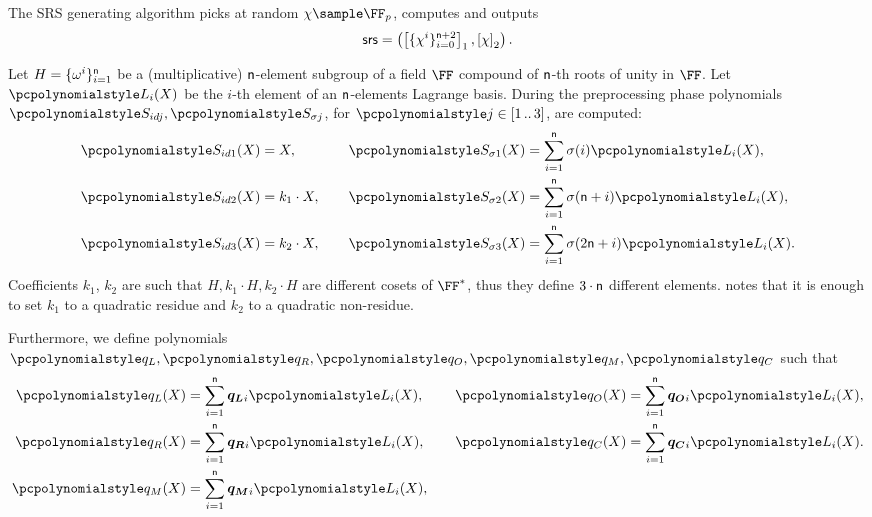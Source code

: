 The SRS generating algorithm picks at random $\chi \sample \FF_p$, computes
and outputs
\[
	\mathsf{srs} = \left(\left[\{\chi^i\}_{i = 0}^{\mathsf{n} + 2}\right]_{1},
	\left[\chi\right]_{2} \right).
\]

Let $H = \{\omega^i\}_{i = 1}^{\mathsf{n} }$ be a
(multiplicative) $\mathsf{n}$-element subgroup of a field $\FF$
compound of $\mathsf{n}$-th roots of unity in $\FF$. Let $\lag_i(X)$ be
the $i$-th element of an $\mathsf{n}$-elements Lagrange basis. During
the preprocessing phase polynomials $\p{S_{id j}}, \p{S_{\sigma j}}$, for
$\p{j} \in \range{1}{3}$, are computed:
\begin{equation*}
  \begin{aligned}
    \p{S_{id 1}}(X) & = X,\vphantom{\sum_{i = 1}^{\noofc} \sigma(i) \lag_i(X),}\\
    \p{S_{id 2}}(X) & = k_1 \cdot X,\vphantom{\sum_{i = 1}^{\noofc} \sigma(i) \lag_i(X),}\\
    \p{S_{id 3}}(X) & = k_2 \cdot X,\vphantom{\sum_{i = 1}^{\noofc} \sigma(i) \lag_i(X),}
  \end{aligned}
  \qquad
\begin{aligned}
  \p{S_{\sigma 1}}(X) & = \sum_{i = 1}^{\noofc} \sigma(i) \lag_i(X),\\
  \p{S_{\sigma 2}}(X) & = \sum_{i = 1}^{\noofc}
  \sigma(\noofc + i) \lag_i(X),\\
  \p{S_{\sigma 3}}(X) & =\sum_{i = 1}^{\noofc} \sigma(2 \noofc + i) \lag_i(X).
\end{aligned}
\end{equation*}
Coefficients $k_1$, $k_2$ are such that $H, k_1 \cdot H, k_2 \cdot H$ are
different cosets of $\FF^*$, thus they define $3 \cdot \mathsf{n}$
different elements. \cite{EPRINT:GabWilCio19} notes that it is enough to set
$k_1$ to a quadratic residue and $k_2$ to a quadratic non-residue.

Furthermore, we define polynomials $\p{q_L}, \p{q_R}, \p{q_O}, \p{q_M}, \p{q_C}$
such that
\begin{equation*}
  \begin{aligned}
  \p{q_L}(X) & = \sum_{i = 1}^{\noofc} \vql_i \lag_i(X), \\
  \p{q_R}(X) & = \sum_{i = 1}^{\noofc} \vqr_i \lag_i(X), \\
  \p{q_M}(X) & = \sum_{i = 1}^{\noofc} \vqm_i \lag_i(X),
\end{aligned}
\qquad
\begin{aligned}
  \p{q_O}(X) & = \sum_{i = 1}^{\noofc} \vqo_i \lag_i(X), \\
  \p{q_C}(X) & = \sum_{i = 1}^{\noofc} \vqc_i \lag_i(X). \\
  \vphantom{\p{q_M}(X)  = \sum_{i = 1}^{\noofc} \vqm_i \lag_i(X),}
\end{aligned}
\end{equation*}

